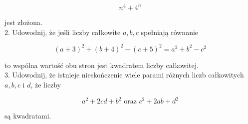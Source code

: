 \documentclass[10pt]{article}
\begin{document}
\[
n^{4}+4^{n}
\]

jest złożona.\\
2. Udowodnij, że jeśli liczby całkowite \(a, b, c\) spełniają równanie

\[
(a+3)^{2}+(b+4)^{2}-(c+5)^{2}=a^{2}+b^{2}-c^{2}
\]

to wspólna wartość obu stron jest kwadratem liczby całkowitej.\\
3. Udowodnij, że istnieje nieskończenie wiele parami różnych liczb całkowitych \(a, b, c\) i \(d\), że liczby

\[
a^{2}+2 c d+b^{2} \text { oraz } c^{2}+2 a b+d^{2}
\]

są kwadratami.
\end{document}
